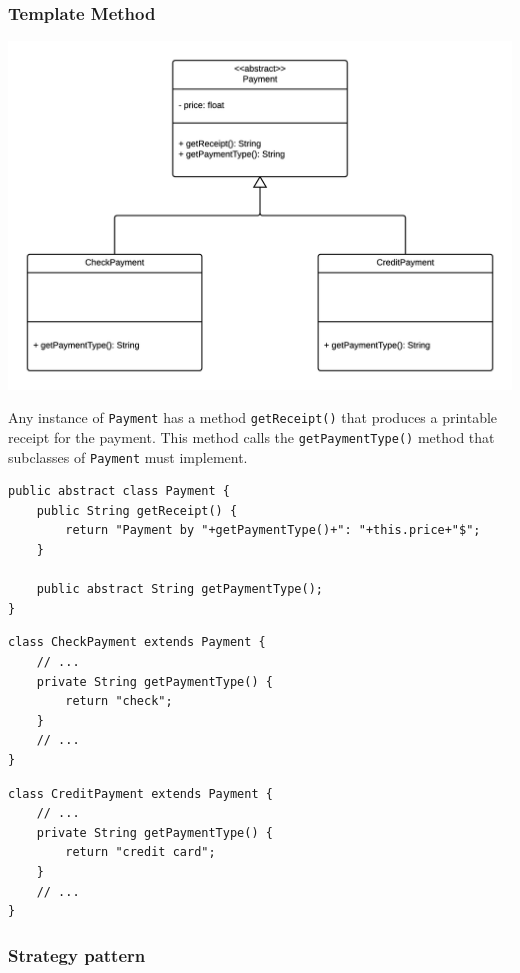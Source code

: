 \documentclass[11pt, a4paper]{article}
\newcommand{\settextlisting}{\lstset{ basicstyle=\small\ttfamily }}
\begin{document}
\subsubsection{Template Method}

\includegraphics[width=\textwidth]{TemplateMethodPattern.png}

\medskip
\settextlisting
Any instance of \lstinline|Payment| has a method \lstinline|getReceipt()| that produces a printable receipt for the payment.
This method calls the \lstinline|getPaymentType()| method that subclasses of \lstinline|Payment| must implement.


\bigskip
\lstset{%
	basicstyle=\scriptsize\ttfamily,
}

\begin{lstlisting}
public abstract class Payment {
	public String getReceipt() {
		return "Payment by "+getPaymentType()+": "+this.price+"$";
	}
	
	public abstract String getPaymentType();
}
\end{lstlisting}


\begin{lstlisting}
class CheckPayment extends Payment {
	// ...
	private String getPaymentType() {
		return "check";
	}
	// ...
}
\end{lstlisting}


\begin{lstlisting}
class CreditPayment extends Payment {
	// ...
	private String getPaymentType() {
		return "credit card";
	}
	// ...
}
\end{lstlisting}




\subsubsection{Strategy pattern}
\end{document}

